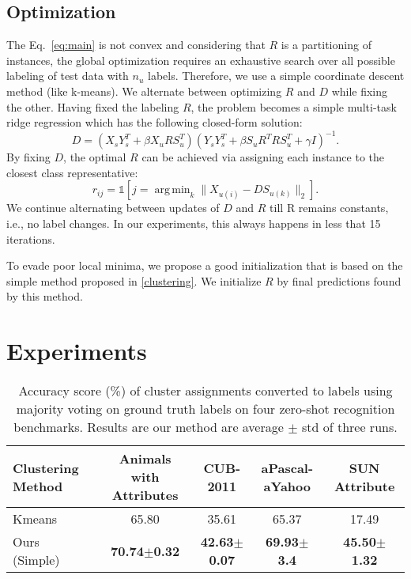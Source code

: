 \documentclass[10pt,twocolumn,letterpaper]{article}
\DeclareMathOperator*{\argmin}{arg\,min}
\begin{document}
\subsection{Optimization} \label{optimization}
The Eq.~\eqref{eq:main} is not convex and considering that $R$ is a partitioning of instances, the global optimization requires an
exhaustive search over all possible labeling of test data with $n_u$ labels. Therefore, we use a simple coordinate descent
method (like k-means). We alternate between optimizing $R$ and $D$ while fixing the other.
Having fixed the labeling $R$, the problem becomes a simple multi-task ridge regression which has the following closed-form solution:
\begin{equation} \label{eq:d_update}
  D = (X_s Y_s^T + \beta X_u R S_u^T) (Y_s Y_s^T + \beta S_u R^T R S_u^T  + \gamma I)^{-1}.
\end{equation}
By fixing $D$, the optimal $R$ can be achieved via assigning each instance to the closest class representative:
\begin{equation} \label{eq:r_update}
  r_{ij} = \mathds{1}[j = \argmin_{k} \lVert X_{u(i)} - D S_{u(k)} \rVert_2 ].
\end{equation}
We continue alternating between updates of $D$ and $R$ till R remains constants, i.e., no label changes. In our experiments, this always happens
in less that 15 iterations.

To evade poor local minima, we propose a good initialization that is based on the simple method proposed in \ref{clustering}. We initialize  $R$ by final predictions found by this method.
\section{Experiments} \label{experiments}
\begin{table*}[ht] \label{tab:cluster}
\begin{minipage}{\textwidth}
\centering
\caption{Accuracy score (\%) of cluster assignments converted to labels
using majority voting on ground truth labels on four zero-shot recognition benchmarks.
Results are our method are average $\pm$ std of three runs.
} \vspace{2mm}
\begin{tabular}{|l|c|c|c|c|}
\hline
Clustering Method & Animals with Attributes & CUB-2011 & aPascal-aYahoo & SUN Attribute \\
\hline
Kmeans                             &  65.80                 & 35.61           & 65.37                & 17.49    \\
\hline
Ours (Simple)                     & \textbf{70.74$\pm$0.32}  & \textbf{42.63$\pm$0.07} & \textbf{69.93$\pm$ 3.4} & \textbf{ 45.50$\pm$1.32} \\
\hline
\end{tabular}
\vspace{2mm}
\end{minipage}
\end{table*}
\end{document}

